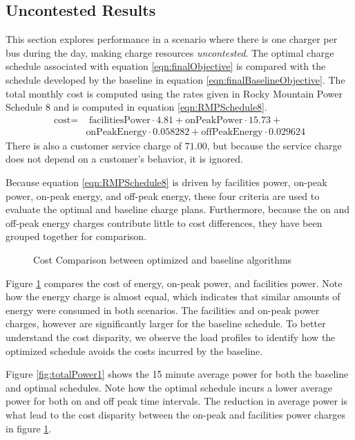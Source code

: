 \subsection{Uncontested Results}
	This section explores performance in a scenario where there is one charger per bus during the day, making charge resources \textit{uncontested}. The optimal charge schedule associated with equation \ref{eqn:finalObjective} is compared with the schedule developed by the baseline in equation \ref{eqn:finalBaselineObjective}. The total monthly cost is computed using the rates given in Rocky Mountain Power Schedule 8 and is computed in equation \ref{eqn:RMPSchedule8}.
	\begin{equation}\label{eqn:RMPSchedule8}
		\begin{aligned}
			\text{cost} = & \text{ facilitiesPower}\cdot 4.81 + \text{onPeakPower}\cdot 15.73 + \\ 
			& \text{onPeakEnergy}\cdot 0.058282 + \text{offPeakEnergy}\cdot 0.029624
		\end{aligned}
	\end{equation}
	There is also a customer service charge of $71.00$, but because the service charge does not depend on a customer's behavior, it is ignored.
	\par Because equation \ref{eqn:RMPSchedule8} is driven by facilities power, on-peak power, on-peak energy, and off-peak energy, these four criteria are used to evaluate the optimal and baseline charge plans.  Furthermore, because the on and off-peak energy charges contribute little to cost differences, they have been grouped together for comparison.
\begin{figure}
	\centering
	\caption{Cost Comparison between optimized and baseline algorithms}
	\label{fig:costComparison}
\end{figure}
\par  Figure \ref{fig:costComparison} compares the cost of energy, on-peak power, and facilities power. Note how the energy charge is almost equal, which indicates that similar amounts of energy were consumed in both scenarios. The facilities and on-peak power charges, however are significantly larger for the baseline schedule. To better understand the cost disparity, we observe the load profiles to identify how the optimized schedule avoids the costs incurred by the baseline.
	\par Figure \ref{fig:totalPower1} shows the 15 minute average power for both the baseline and optimal schedules. Note how the optimal schedule incurs a lower average power for both on and off peak time intervals. The reduction in average power is what lead to the cost disparity between the on-peak and facilities power charges in figure \ref{fig:costComparison}. 
